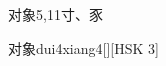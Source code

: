 \begin{entry}{对象}{5,11}{⼨、⾗}
  \begin{phonetics}{对象}{dui4xiang4}[][HSK 3]
  \end{phonetics}
\end{entry}
